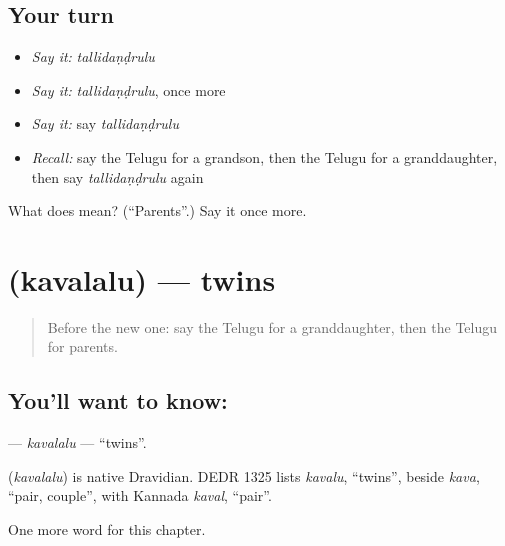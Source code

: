 \subsection*{Your turn}
\begin{itemize}
\raggedright
  \item \emph{Say it:} \emph{tallidaṇḍrulu}
  \item \emph{Say it:} \emph{tallidaṇḍrulu}, once more
  \item \emph{Say it:} say \emph{tallidaṇḍrulu}
  \item \emph{Recall:} say the Telugu for a grandson, then the Telugu for a granddaughter, then say \emph{tallidaṇḍrulu} again
\end{itemize}

\begin{tcolorbox}[breakable,colback=teal!4,colframe=teal!35!black,title={Before you move on}]
What does  mean? (\textquotedblleft{}Parents\textquotedblright{}.) Say it once more.
\end{tcolorbox}
\section[\texorpdfstring{\te{కవలలు} (kavalalu)}{కవలలు (kavalalu)}]{ (kavalalu) — twins}

\label{lesson:TE-C186-kavalalu}



\begin{quote}
Before the new one: say the Telugu for a granddaughter, then the Telugu for parents.
\end{quote}

\subsection*{You'll want to know: }
\textbf{} — \emph{kavalalu} — \textquotedblleft{}twins\textquotedblright{}.

\begin{cousinweb}
\textbf{} (\emph{kavalalu}) is native Dravidian. DEDR 1325 lists \emph{kavalu}, \textquotedblleft{}twins\textquotedblright{}, beside \emph{kava}, \textquotedblleft{}pair, couple\textquotedblright{}, with Kannada \emph{kaval}, \textquotedblleft{}pair\textquotedblright{}.
\end{cousinweb}

\begin{grammarlens}[title={What you've built}]
One more word for this chapter.
\end{grammarlens}

